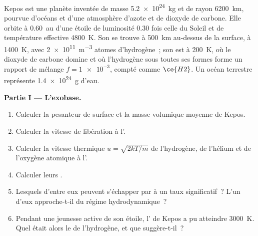 \begin{problem}
\label{pb:b3:planetary-atmospheres:1}
Kepos est une planète inventée de masse \qty{5.2e24}{kg} et de rayon
\qty{6200}{km}, pourvue d'océans et d'une atmosphère d'azote et de dioxyde de carbone.
Elle orbite à \qty{0.60}{au} d'une étoile de luminosité 0.30 fois celle du
Soleil et de température effective \qty{4800}{K}. Son  se trouve à
\qty{500}{km} au-dessus de la surface, à \qty{1400}{K}, avec
\qty{2e11}{m^{-3}} atomes d'hydrogène~; son  est à \qty{200}{K},
où le dioxyde de carbone domine et où l'hydrogène sous toutes ses formes forme un
rapport de mélange $f = \num{1e-3}$, compté comme $\ce{H2}$. Un océan terrestre représente
\qty{1.4e24}{g} d'eau.

\medskip\noindent\textbf{Partie I --- L'exobase.}
\begin{enumerate}
\item Calculer la pesanteur de surface et la masse volumique moyenne de Kepos.
\item Calculer la vitesse de libération à l'.
\item Calculer la vitesse thermique $u = \sqrt{2kT/m}$ de l'hydrogène, de l'hélium et
  de l'oxygène atomique à l'.
\item Calculer leurs .
\item Lesquels d'entre eux peuvent s'échapper par  à un taux significatif~?
  L'un d'eux approche-t-il du régime hydrodynamique~?
\item Pendant une jeunesse active de son étoile, l' de Kepos a pu
  atteindre \qty{3000}{K}. Quel était alors le  de
  l'hydrogène, et que suggère-t-il~?
\end{enumerate}


\end{problem}
